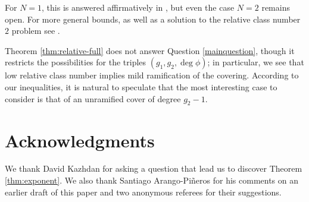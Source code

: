 \documentclass[11pt]{amsart}
\theoremstyle{definition}
\theoremstyle{remark}
\begin{document}
For $N=1$, this is answered affirmatively in \cite{Kedlaya1, kedlaya2, kedlaya3}, but even the case $N=2$ remains open.  For more general bounds, as well as a solution to the relative class number $2$ problem see \cite{PinerosEtAl}.

Theorem \ref{thm:relative-full} does not answer Question \ref{mainquestion}, though it restricts the possibilities for the triples $(g_1, g_2, \deg \phi)$; in particular, we see that low relative class number implies mild ramification of the covering. According to our inequalities, it is natural to speculate that the most interesting case to consider is that of an unramified cover of degree $g_2-1$.

\section*{Acknowledgments}
We thank David Kazhdan for asking a question that lead us to discover Theorem  \ref{thm:exponent}. We also thank Santiago Arango-Pi{\~n}eros for his comments on an earlier draft of this paper and two anonymous referees for their suggestions. 



\end{document}

